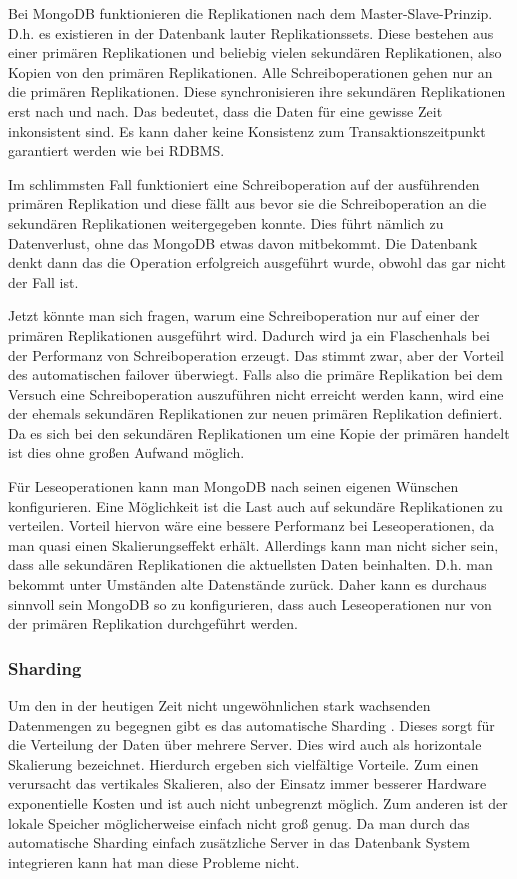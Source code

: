 Bei MongoDB funktionieren die Replikationen nach dem Master-Slave-Prinzip. \cite{mongodb:replication}
D.h. es existieren in der Datenbank lauter Replikationssets. Diese bestehen
aus einer primären Replikationen und beliebig vielen sekundären Replikationen, also Kopien von den
primären Replikationen. Alle Schreiboperationen gehen nur an die primären Replikationen. Diese synchronisieren ihre sekundären
Replikationen erst nach und nach. Das bedeutet, dass die Daten für eine gewisse Zeit
inkonsistent sind. Es kann daher keine Konsistenz zum Transaktionszeitpunkt garantiert werden wie bei RDBMS.

Im schlimmsten Fall funktioniert eine Schreiboperation auf der ausführenden primären Replikation und
diese fällt aus bevor sie die Schreiboperation an die sekundären Replikationen
weitergegeben konnte. Dies führt nämlich zu Datenverlust, ohne das MongoDB
etwas davon mitbekommt. Die Datenbank denkt dann das die Operation
erfolgreich ausgeführt wurde, obwohl das gar nicht der Fall ist.

Jetzt könnte man sich fragen, warum eine Schreiboperation nur auf einer der primären Replikationen ausgeführt wird.
Dadurch wird ja ein Flaschenhals bei der Performanz von Schreiboperation erzeugt.
Das stimmt zwar, aber der Vorteil des automatischen failover überwiegt. Falls also
die primäre Replikation bei dem Versuch eine Schreiboperation auszuführen nicht erreicht werden kann,
wird eine der ehemals sekundären Replikationen zur neuen primären Replikation definiert. Da es sich bei den sekundären Replikationen
um eine Kopie der primären handelt ist dies ohne großen Aufwand möglich.

Für Leseoperationen kann man MongoDB nach seinen eigenen Wünschen konfigurieren. \cite{mongodb:replication}
Eine Möglichkeit ist die Last auch auf sekundäre Replikationen zu verteilen.
Vorteil hiervon wäre eine bessere Performanz bei Leseoperationen, da man quasi einen
Skalierungseffekt erhält. Allerdings kann man nicht sicher
sein, dass alle sekundären Replikationen die aktuellsten Daten beinhalten.
D.h. man bekommt unter Umständen alte Datenstände zurück. Daher kann es durchaus sinnvoll sein
MongoDB so zu konfigurieren, dass auch Leseoperationen nur von der primären Replikation durchgeführt werden.

\subsubsection{Sharding}
Um den in der heutigen Zeit nicht ungewöhnlichen stark wachsenden Datenmengen
zu begegnen gibt es das automatische Sharding \cite{mongodb:sharding}. Dieses sorgt für die
Verteilung der Daten über mehrere Server. Dies wird auch als
horizontale Skalierung bezeichnet. Hierdurch ergeben sich vielfältige Vorteile. Zum
einen verursacht das vertikales Skalieren, also der Einsatz immer
besserer Hardware exponentielle Kosten und ist auch nicht unbegrenzt möglich. Zum anderen ist der lokale
Speicher möglicherweise einfach nicht groß genug. Da man durch das automatische Sharding einfach zusätzliche Server
in das Datenbank System integrieren kann hat man diese Probleme nicht.

